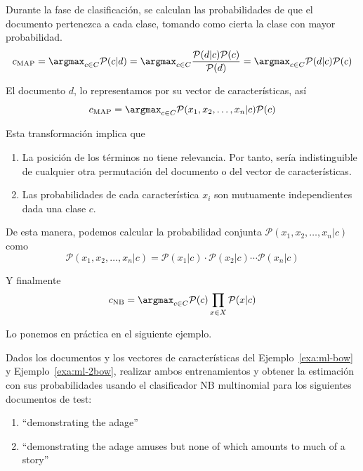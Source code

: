 Durante la fase de clasificación, se calculan las probabilidades de que el documento pertenezca a cada clase, tomando como cierta la clase con mayor probabilidad.
\begin{equation}
c_\text{MAP} = \argmax_{c\in C} \mathcal{P}(c|d) 
= \argmax_{c\in C} \frac{\mathcal{P}(d|c)\mathcal{P}(c)}{\mathcal{P}(d)}
= \argmax_{c\in C} \mathcal{P}(d|c)\mathcal{P}(c)
\end{equation}

El documento $d$, lo representamos por su vector de características, así
\begin{equation}
c_\text{MAP} = \argmax_{c\in C} \mathcal{P}(x_1,x_2,\ldots,x_n|c)\mathcal{P}(c)
\end{equation}

Esta transformación implica que
\begin{enumerate}
\item La posición de los términos no tiene relevancia. Por tanto, sería indistinguible de cualquier otra permutación del documento o del vector de características. 
\item Las probabilidades de cada característica $x_i$ son mutuamente independientes dada una clase $c$.
\end{enumerate}

De esta manera, podemos calcular la probabilidad conjunta $\mathcal{P}(x_1,x_2,\ldots,x_n|c)$ como
\begin{equation}
\mathcal{P}(x_1,x_2,\ldots,x_n|c) = \mathcal{P}(x_1|c) \cdot \mathcal{P}(x_2|c) \cdots \mathcal{P}(x_n|c)
\end{equation}

Y finalmente
\begin{equation}
c_\text{NB} = \argmax_{c\in C} \mathcal{P}(c) \prod_{x\in X} \mathcal{P}(x|c)
\end{equation}

Lo ponemos en práctica en el siguiente ejemplo.

\begin{example}
Dados los documentos y los vectores de características del Ejemplo~\ref{exa:ml-bow} y Ejemplo~\ref{exa:ml-2bow}, realizar ambos entrenamientos y obtener la estimación con sus probabilidades usando el clasificador NB multinomial para los siguientes documentos de test:
\begin{enumerate}
\item ``demonstrating the adage''
\item ``demonstrating the adage amuses but none of which amounts to much of a story''
\end{enumerate}
\end{example}

